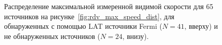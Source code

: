 \begin{figure}[]
 \caption{Распределение максимальной измеренной видимой скорости для 65 источников на
рисунке~\ref{fig:rdv_max_speed_dist}, для обнаруженных с помощью LAT источники Fermi ($N =
41$, вверху) и не обнаруженных источников ($N = 24$, внизу).}
 \label{fig:rdv_speed_gamma}
\end{figure}

